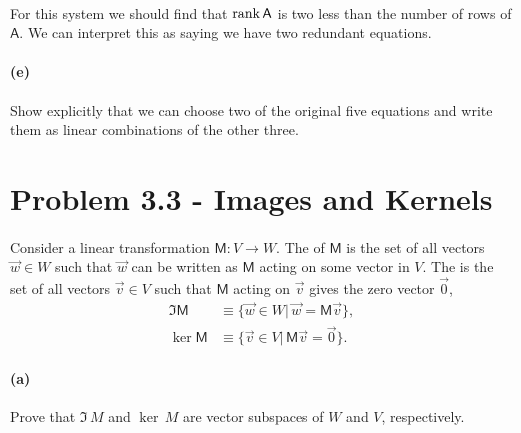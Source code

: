 \documentclass{article}
\begin{document}
\paragraph{}
For this system we should find that $\rank{\mathsf{A}}$ is two less than the number of rows of $\mathsf{A}$.  We can interpret this as saying we have
two redundant equations.


\paragraph{(e)}		\extrapart
Show explicitly that we can choose two of the original five equations and write them as linear combinations of the other three.


\bigskip
\pagebreak
\section*{Problem 3.3 - Images and Kernels}


\paragraph{}
Consider a linear transformation $\mathsf{M}:V\to W$.  
The  of $\mathsf{M}$ is the set of all vectors $\vec{w}\in W$ such that $\vec{w}$ can be written as $\mathsf{M}$ acting 
on some vector in $V$.  
The  is the set of all vectors $\vec{v}\in V$ such that $\mathsf{M}$ acting on $\vec{v}$ gives the zero vector $\vec{0}$,
	\begin{align*}
		\Im{\mathsf{M}} &\equiv \{\vec{w}\in W|\,\vec{w} = \mathsf{M}\vec{v}\},\\
		\ker \mathsf{M} &\equiv \{\vec{v}\in V|\,\mathsf{M}\vec{v} = \vec{0}\}.
	\end{align*}

\paragraph{(a)}
Prove that $\Im\,M$ and $\ker\,M$ are vector subspaces of $W$ and $V$, respectively.  \\
\end{document}
